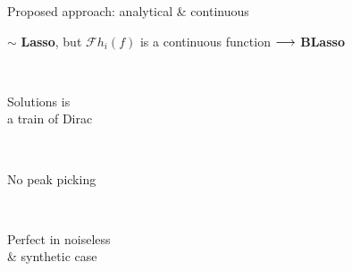 \begin{frame}{Proposed approach: analytical \& continuous \hfill\faJediOrder}
        \vfill
        \begin{center}
            \small
            $\sim$ \textbf{Lasso}, but $\mathcal{F}h_i (f)$ is a continuous function $\longrightarrow$ \textbf{BLasso}~\cite{azais2015spike}

            \textcolor{mygreen}{ \quad
            \cmark \, \parbox{8.5em}{Solutions is \\ a train of Dirac} \quad
            \cmark \, \parbox{8em}{No peak picking} \quad
            \cmark \, \parbox{9em}{Perfect in noiseless\\\& synthetic case}
            }
        \end{center}


\end{frame}


